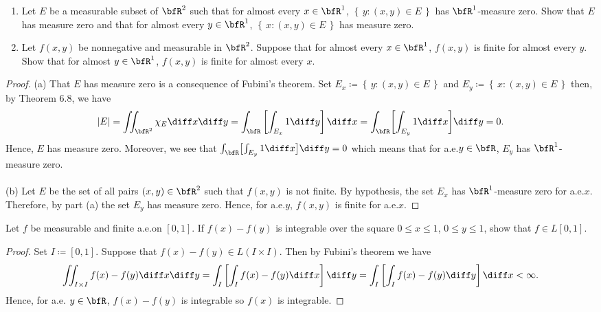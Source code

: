 
\begin{problem}
\begin{enumerate}[label=(\alph*)]
\item Let $E$ be a measurable subset of $\bfR^2$ such that for almost every
  $x\in\bfR^1$, $\left\{\,y:(x,y)\in E\,\right\}$ has
  $\bfR^1$-measure zero. Show that $E$ has measure zero and that for almost
  every $y\in\bfR^1$, $\left\{\,x:(x,y)\in E\,\right\}$ has
  measure zero.
\item Let $f(x,y)$ be nonnegative and measurable in $\bfR^2$. Suppose that
  for almost every $x\in\bfR^1$, $f(x,y)$ is finite for almost every
  $y$. Show that for almost $y\in\bfR^1$, $f(x,y)$ is finite for almost
  every $x$.
\end{enumerate}
\end{problem}
\begin{proof}
(a) That $E$ has measure zero is a consequence of Fubini's theorem. Set
$E_x\coloneqq\left\{\,y:(x,y)\in E\,\right\}$ and
$E_y\coloneqq\left\{\,x:(x,y)\in E\,\right\}$ then, by Theorem 6.8, we have
\begin{equation}
\label{eq:consequence-of-fubini}
|E|=
\iint_{\bfR^2}\chi_E\diff x\diff y=
\int_\bfR\left[\int_{E_x}1\diff y\right]\diff x=
\int_\bfR\biggl[\int_{E_y}1\diff x\biggr]\diff y=
0.
\end{equation}
Hence, $E$ has measure zero. Moreover, we see that
$\int_\bfR\bigl[\int_{E_y}1\diff x\bigr]\diff y=0$ which means that for
a.e.\@ $y\in\bfR$, $E_y$ has $\bfR^1$-measure zero.
\\\\
(b) Let $E$ be the set of all pairs $(x,y)\in\bfR^2$ such that $f(x,y)$ is
not finite. By hypothesis, the set $E_x$ has $\bfR^1$-measure zero for
a.e.\@ $x$. Therefore, by part (a) the set $E_y$ has measure zero. Hence,
for a.e.\@ $y$, $f(x,y)$ is finite for a.e.\@ $x$.
\end{proof}
\newpage

\begin{problem}
Let $f$ be measurable and finite a.e.\@ on $[0,1]$. If $f(x)-f(y)$ is
integrable over the square $0\leq x\leq 1$, $0\leq y\leq 1$, show that
$f\in L[0,1]$.
\end{problem}
\begin{proof}
Set $I\coloneqq[0,1]$. Suppose that $f(x)-f(y)\in L(I\times I)$. Then by
Fubini's theorem we have
\begin{equation}
  \label{eq:double-integral}
\iint_{I\times I}f(x)-f(y)\diff x\diff y=
\int_I\left[\int_I f(x)-f(y)\diff x\right]\diff y=
\int_I\left[\int_I f(x)-f(y)\diff y\right]\diff x<\infty.
\end{equation}
Hence, for a.e. $y\in\bfR$, $f(x)-f(y)$ is integrable so $f(x)$ is
integrable.
\end{proof}
\newpage

